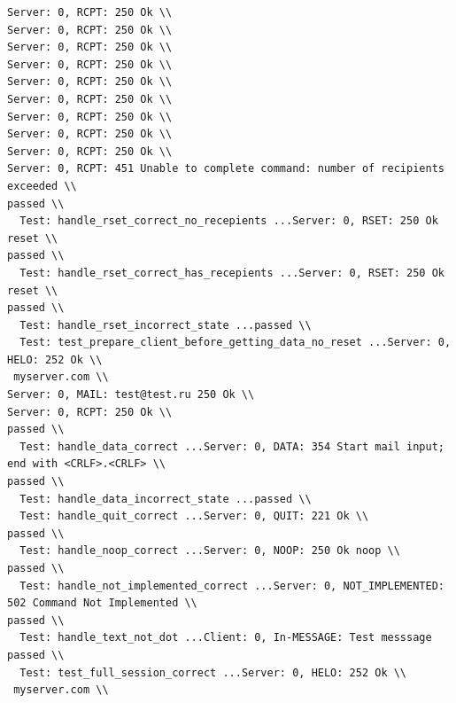 \documentclass[a4paper,12pt]{report}
\begin{document}
\begin{verbatim}
Server: 0, RCPT: 250 Ok \\
Server: 0, RCPT: 250 Ok \\
Server: 0, RCPT: 250 Ok \\
Server: 0, RCPT: 250 Ok \\
Server: 0, RCPT: 250 Ok \\
Server: 0, RCPT: 250 Ok \\
Server: 0, RCPT: 250 Ok \\
Server: 0, RCPT: 250 Ok \\
Server: 0, RCPT: 250 Ok \\
Server: 0, RCPT: 451 Unable to complete command: number of recipients exceeded \\
passed \\
  Test: handle_rset_correct_no_recepients ...Server: 0, RSET: 250 Ok reset \\
passed \\
  Test: handle_rset_correct_has_recepients ...Server: 0, RSET: 250 Ok reset \\
passed \\
  Test: handle_rset_incorrect_state ...passed \\
  Test: test_prepare_client_before_getting_data_no_reset ...Server: 0, HELO: 252 Ok \\
 myserver.com \\
Server: 0, MAIL: test@test.ru 250 Ok \\
Server: 0, RCPT: 250 Ok \\
passed \\
  Test: handle_data_correct ...Server: 0, DATA: 354 Start mail input; end with <CRLF>.<CRLF> \\
passed \\
  Test: handle_data_incorrect_state ...passed \\
  Test: handle_quit_correct ...Server: 0, QUIT: 221 Ok \\
passed \\
  Test: handle_noop_correct ...Server: 0, NOOP: 250 Ok noop \\
passed \\
  Test: handle_not_implemented_correct ...Server: 0, NOT_IMPLEMENTED: 502 Command Not Implemented \\
passed \\
  Test: handle_text_not_dot ...Client: 0, In-MESSAGE: Test messsage passed \\
  Test: test_full_session_correct ...Server: 0, HELO: 252 Ok \\
 myserver.com \\

\end{verbatim}
\end{document}
